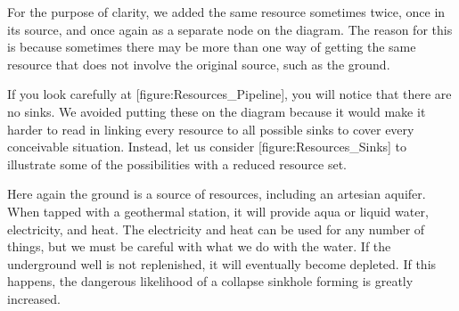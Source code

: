 For the purpose of clarity, we added the same resource sometimes twice, once in its source, and once again as a separate node on the diagram. The reason for this is because sometimes there may be more than one way of getting the same resource that does not involve the original source, such as the ground. 

If you look carefully at [figure:Resources_Pipeline], you will notice that there are no sinks. We avoided putting these on the diagram because it would make it harder to read in linking every resource to all possible sinks to cover every conceivable situation. Instead, let us consider [figure:Resources_Sinks] to illustrate some of the possibilities with a reduced resource set.

    {}

Here again the ground is a source of resources, including an artesian aquifer. When tapped with a geothermal station, it will provide aqua or liquid water, electricity, and heat. The electricity and heat can be used for any number of things, but we must be careful with what we do with the water. If the underground well is not replenished, it will eventually become depleted. If this happens, the dangerous likelihood of a collapse sinkhole forming is greatly increased.


